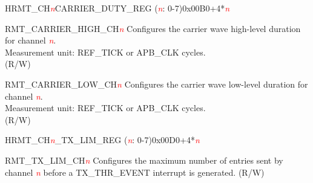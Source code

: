 \begin{register}{H}{RMT\_CH\textcolor{red}{\it{n}}CARRIER\_DUTY\_REG (\textcolor{red}{\it{n}}: 0-7)}{0x00B0+4*\textcolor{red}{\it{n}}}\label{regdesc:RMTCHnCARRIERDUTYREG}
%
%
\regnewline%
\begin{regdesc}\begin{reglist}
\item [RMT\_CARRIER\_HIGH\_CH\textcolor{red}{\it{n}}] Configures the carrier wave high-level duration for channel \textcolor{red}{\it{n}}.\\
Measurement unit: REF\_TICK or APB\_CLK cycles.\\ (R/W)
\item [RMT\_CARRIER\_LOW\_CH\textcolor{red}{\it{n}}] Configures the carrier wave low-level duration for channel \textcolor{red}{\it{n}}.\\
Measurement unit: REF\_TICK or APB\_CLK cycles.\\ (R/W)
\end{reglist}\end{regdesc}
\end{register}


\begin{register}{H}{RMT\_CH\textcolor{red}{\it{n}}\_TX\_LIM\_REG (\textcolor{red}{\it{n}}: 0-7)}{0x00D0+4*\textcolor{red}{\it{n}}}\label{regdesc:RMTCHnTXLIMREG}
%
%
\regnewline%
\begin{regdesc}\begin{reglist}
\item [RMT\_TX\_LIM\_CH\textcolor{red}{\it{n}}] Configures the maximum number of entries sent by channel \textcolor{red}{\it{n}} before a TX\_THR\_EVENT interrupt is generated. (R/W)
\end{reglist}\end{regdesc}
\end{register}



